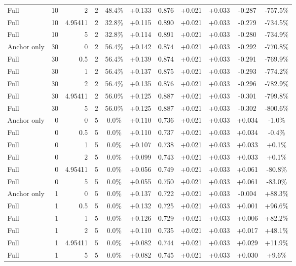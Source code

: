 \begin{table}[htbp]
\begin{tabular}{lrrrccccccc}
Full & 10 & 2 & 2 & 48.4\% & +0.133 & 0.876 & +0.021 & +0.033 & -0.287 & -757.5\% \\
Full & 10 & 4.95411 & 2 & 32.8\% & +0.115 & 0.890 & +0.021 & +0.033 & -0.279 & -734.5\% \\
Full & 10 & 5 & 2 & 32.8\% & +0.114 & 0.891 & +0.021 & +0.033 & -0.280 & -734.9\% \\
Anchor only & 30 & 0 & 2 & 56.4\% & +0.142 & 0.874 & +0.021 & +0.033 & -0.292 & -770.8\% \\
Full & 30 & 0.5 & 2 & 56.4\% & +0.139 & 0.874 & +0.021 & +0.033 & -0.291 & -769.9\% \\
Full & 30 & 1 & 2 & 56.4\% & +0.137 & 0.875 & +0.021 & +0.033 & -0.293 & -774.2\% \\
Full & 30 & 2 & 2 & 56.4\% & +0.135 & 0.876 & +0.021 & +0.033 & -0.296 & -782.9\% \\
Full & 30 & 4.95411 & 2 & 56.0\% & +0.125 & 0.887 & +0.021 & +0.033 & -0.301 & -799.8\% \\
Full & 30 & 5 & 2 & 56.0\% & +0.125 & 0.887 & +0.021 & +0.033 & -0.302 & -800.6\% \\
Anchor only & 0 & 0 & 5 & 0.0\% & +0.110 & 0.736 & +0.021 & +0.033 & +0.034 & -1.0\% \\
Full & 0 & 0.5 & 5 & 0.0\% & +0.110 & 0.737 & +0.021 & +0.033 & +0.034 & -0.4\% \\
Full & 0 & 1 & 5 & 0.0\% & +0.107 & 0.738 & +0.021 & +0.033 & +0.033 & +0.1\% \\
Full & 0 & 2 & 5 & 0.0\% & +0.099 & 0.743 & +0.021 & +0.033 & +0.033 & +0.1\% \\
Full & 0 & 4.95411 & 5 & 0.0\% & +0.056 & 0.749 & +0.021 & +0.033 & +0.061 & -80.8\% \\
Full & 0 & 5 & 5 & 0.0\% & +0.055 & 0.750 & +0.021 & +0.033 & +0.061 & -83.0\% \\
Anchor only & 1 & 0 & 5 & 0.0\% & +0.137 & 0.722 & +0.021 & +0.033 & -0.004 & +88.3\% \\
Full & 1 & 0.5 & 5 & 0.0\% & +0.132 & 0.725 & +0.021 & +0.033 & +0.001 & +96.6\% \\
Full & 1 & 1 & 5 & 0.0\% & +0.126 & 0.729 & +0.021 & +0.033 & +0.006 & +82.2\% \\
Full & 1 & 2 & 5 & 0.0\% & +0.110 & 0.735 & +0.021 & +0.033 & +0.017 & +48.1\% \\
Full & 1 & 4.95411 & 5 & 0.0\% & +0.082 & 0.744 & +0.021 & +0.033 & +0.029 & +11.9\% \\
Full & 1 & 5 & 5 & 0.0\% & +0.082 & 0.745 & +0.021 & +0.033 & +0.030 & +9.6\% \\

\end{tabular}
\end{table}
